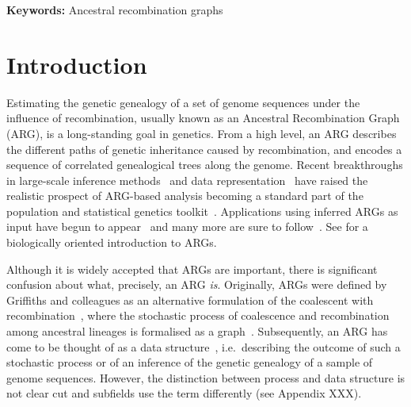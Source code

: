 \documentclass{article}
\begin{document}
\textbf{Keywords:} Ancestral recombination graphs

\linenumbers
\section*{Introduction}
Estimating the genetic genealogy of a set of genome sequences
under the influence of recombination,
usually known as an Ancestral Recombination Graph (ARG), is a long-standing
goal in genetics.
From a high level, an ARG describes the different paths of genetic inheritance
caused by recombination, and encodes a sequence of correlated genealogical
trees along the genome.
Recent breakthroughs
in large-scale inference
methods~\citep{rasmussen2014genome,kelleher2019inferring,speidel2019method,
schaefer2021ancestral,wohns2022unified,zhang2023biobank,zhan2023towards}
and data representation~\citep{kelleher2016efficient,kelleher2018efficient}
have raised the realistic prospect of ARG-based analysis becoming a standard part
of the population and statistical genetics toolkit~\citep{hejase2020summary}.
Applications using inferred ARGs as input have begun to
appear~\citep{osmond2021estimating,fan2022genealogical,hejase2022deep,zhang2023biobank,
nowbandegani2023extremely,ignatieva2023distribution}
and many more are sure to
follow~\citep{harris2019database,harris2023using}.
See \citet{lewanski2023era} for a biologically oriented introduction to ARGs.

Although it is widely accepted that ARGs are important, there is significant
confusion about what, precisely, an ARG \emph{is}.
Originally, ARGs were defined by Griffiths and colleagues as an alternative
formulation of the coalescent with recombination~\citep{hudson1983properties},
where the stochastic process of coalescence and recombination
among ancestral lineages is formalised as a
graph~\citep{griffiths1991two,ethier1990two,griffiths1996ancestral,griffiths1997ancestral}.
Subsequently, an ARG  has come to be thought of as a data
structure~\citep{minichiello2006mapping}, i.e.\ describing
the outcome of such a stochastic process or of an inference
of the genetic genealogy of a sample of genome sequences.
However, the distinction between process and data structure is not clear cut
and subfields use the term
differently (see Appendix XXX).
\end{document}
